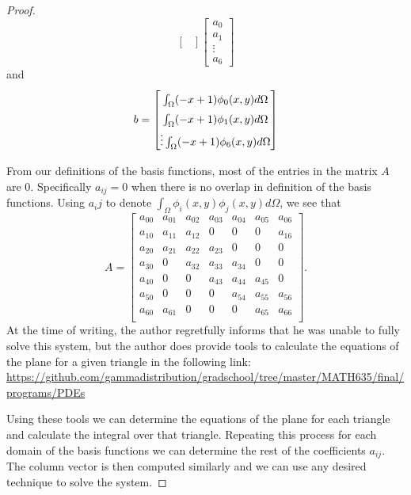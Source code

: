 \begin{proof}
\[\begin{bmatrix}
    \end{bmatrix}
    \begin{bmatrix}
      a_0 \\
      a_1 \\
      \vdots \\
      a_6
    \end{bmatrix}
  \]
  and
  \[
  b =
    \renewcommand\arraystretch{1.5}
  \begin{bmatrix}
    \int_\Omega (-x + 1) \phi_0(x,y) d\Omega \\
    \int_\Omega (-x + 1) \phi_1(x,y) d\Omega \\
    \vdots
    \int_\Omega (-x + 1) \phi_6(x,y) d\Omega
  \end{bmatrix}
  \]

  From our definitions of the basis functions, most of the entries in the matrix
  $A$ are 0. Specifically $a_{ij} = 0$ when there is no overlap in definition of
  the basis functions. Using $a_ij$ to denote $\int_\Omega \phi_i(x,y)\phi_j(x,y) d\Omega$,
  we see that
  \[
    A =
    \begin{bmatrix}
      a_{00} & a_{01} & a_{02} & a_{03} & a_{04} & a_{05} & a_{06} \\
      a_{10} & a_{11} & a_{12} & 0 & 0 & 0 & a_{16} \\
      a_{20} & a_{21} & a_{22} & a_{23} & 0 & 0 & 0  \\
      a_{30} & 0 & a_{32} & a_{33} & a_{34} & 0 & 0 \\
      a_{40} & 0 & 0  & a_{43} & a_{44} & a_{45} & 0 \\
      a_{50} & 0 & 0 & 0 & a_{54} & a_{55} & a_{56} \\
      a_{60} & a_{61} & 0 & 0 & 0 & a_{65} & a_{66} \\
    \end{bmatrix}.
  \]
  At the time of writing, the author regretfully informs that he was unable to fully solve this system,
  but the author does provide tools to calculate the equations of the plane for a given triangle
  in the following link:
  \url{https://github.com/gammadistribution/gradschool/tree/master/MATH635/final/programs/PDEs}

  Using these tools we can determine the equations of the plane for
  each triangle and calculate the integral over that triangle. Repeating this process
  for each domain of the basis functions we can determine the rest of the coefficients $a_{ij}$.
  The column vector is then computed similarly and we can use any desired technique
  to solve the system.
\end{proof}
